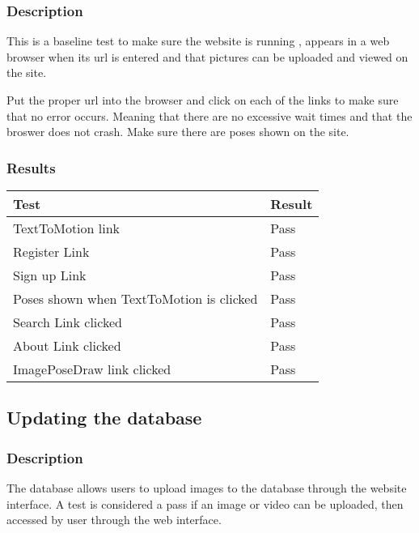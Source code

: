 \documentclass{scrreprt}
\begin{document}
\subsubsection{Description}
\begin{flushleft}
This is a baseline test to make sure the website is running , appears in a web browser when its url is entered and that pictures can be uploaded and viewed on the site.

Put the proper url into the browser and click on each of the links to make sure that no error occurs.  Meaning that there are no excessive wait times and that the broswer does not crash.  Make sure there are poses shown on the site.
\end{flushleft}
\subsubsection{Results}
 \centering
 \begin{tabular}{||p{5cm}|p{2.5cm}||}
 \hline
 \textbf Test & \textbf Result\\
 \hline\hline
  TextToMotion link & Pass  \\
   \hline
  Register Link & Pass  \\
   \hline
  Sign up Link & Pass  \\
     \hline
 Poses shown when TextToMotion is clicked & Pass  \\
      \hline
 Search Link clicked & Pass  \\
      \hline
 About Link clicked & Pass  \\
      \hline
 ImagePoseDraw link clicked & Pass  \\
 \hline
\end{tabular}

\subsection{Updating the database}
\subsubsection{Description}
\begin{flushleft}
The database allows users to upload images to the database through the website
interface. A test is considered a pass if an image or video can be uploaded,
then accessed by user through the web interface.
\end{flushleft}
\end{document}
